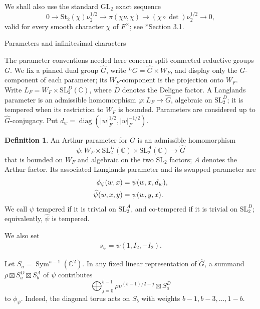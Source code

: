 \documentclass[12pt]{amsart}
\makeatletter
\renewcommand{\subsection}{\@startsection{subsection}{2}%
  \z@{.7\linespacing\@plus.5\linespacing}{.35\linespacing}%
  {\normalfont\bfseries\raggedright}}
\theoremstyle{definition}
\newtheorem{definition}{Definition}[section]
\theoremstyle{plain}
\theoremstyle{remark}
\def\C{\mathbb{C}}%
\def\GL{\mathrm{GL}}
\def\SL{\mathrm{SL}}
\DeclareMathOperator{\diag}{diag} %
\DeclareMathOperator{\Sym}{Sym}%
\numberwithin{equation}{section}
\newcommand{\St}{\mathrm{St}}
\makeatother
\begin{document}
We shall also use the standard $\GL_2$ exact sequence
\begin{equation}\label{eq:GL2-length-two}
 0\longrightarrow\St_2(\chi)\nu_2^{1/2}
 \longrightarrow\pi(\chi\nu,\chi)
 \longrightarrow(\chi\circ\det)\nu_2^{1/2}\longrightarrow0,
\end{equation}
valid for every smooth character $\chi$ of $F^\times$; see
\cite{GanSavin2023-HoweDualityDichotomyExceptionalThetaCorrespondences}*{Section 3.1}.

\subsection{Parameters and infinitesimal characters}\label{subsec:parameters-and-infinitesimal-characters}

The parameter conventions needed here concern split connected reductive
groups $G$. We fix a pinned dual group $\widehat G$, write
${}^LG=\widehat G\times W_F$, and display only the $\widehat G$-component
of each parameter; its $W_F$-component is the projection onto $W_F$.
Write $L_F=W_F\times\SL_2^D(\C)$, where $D$ denotes the Deligne factor.
A Langlands parameter is an admissible homomorphism
$\varphi:L_F\to\widehat G$, algebraic on $\SL_2^D$; it is tempered
when its restriction to $W_F$ is bounded. Parameters are considered
up to $\widehat G$-conjugacy. Put
$d_w=\diag(|w|_F^{1/2},|w|_F^{-1/2})$.

\begin{definition}\label{def:parameters}
An Arthur parameter for $G$ is an admissible homomorphism
\[
 \psi:W_F\times\SL_2^D(\C)\times\SL_2^A(\C)\longrightarrow\widehat G
\]
that is bounded on $W_F$ and algebraic on the two $\SL_2$ factors;
$A$ denotes the Arthur factor. Its associated Langlands parameter
and its swapped parameter are
\begin{align}
 \phi_\psi(w,x)&=\psi(w,x,d_w),\label{eq:associated}\\
 \widehat\psi(w,x,y)&=\psi(w,y,x).\notag
\end{align}
We call $\psi$ tempered if it is trivial on $\SL_2^A$, and
co-tempered if it is trivial on $\SL_2^D$; equivalently,
$\widehat\psi$ is tempered.

We also set 
\begin{align*}
      s_{\psi}=\psi(1, I_2, -I_2).
\end{align*}
\end{definition}

Let $S_a=\Sym^{a-1}(\C^2)$. In any fixed linear representation
of $\widehat G$, a summand $\rho\boxtimes S_a^D\boxtimes S_b^A$
of $\psi$ contributes
\begin{equation}\label{eq:parameter-block}
 \bigoplus_{j=0}^{b-1}\rho\nu^{(b-1)/2-j}\boxtimes S_a^D
\end{equation}
to $\phi_\psi$. Indeed, the diagonal torus acts on $S_b$ with weights
$b-1,b-3,\ldots,1-b$.
\end{document}
